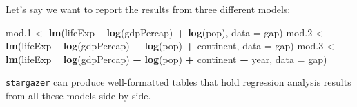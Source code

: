 \documentclass[]{book}
\newenvironment{Shaded}{\begin{snugshade}}{\end{snugshade}}
\newcommand{\DataTypeTok}[1]{\textcolor[rgb]{0.13,0.29,0.53}{#1}}
\newcommand{\FloatTok}[1]{\textcolor[rgb]{0.00,0.00,0.81}{#1}}
\newcommand{\KeywordTok}[1]{\textcolor[rgb]{0.13,0.29,0.53}{\textbf{#1}}}
\newcommand{\NormalTok}[1]{#1}
\newcommand{\OperatorTok}[1]{\textcolor[rgb]{0.81,0.36,0.00}{\textbf{#1}}}
\newcommand{\StringTok}[1]{\textcolor[rgb]{0.31,0.60,0.02}{#1}}
\begin{document}
Let's say we want to report the results from three different models:

\begin{Shaded}
\begin{Highlighting}[]
\NormalTok{mod}\FloatTok{.1}\NormalTok{ <-}\StringTok{ }\KeywordTok{lm}\NormalTok{(lifeExp }\OperatorTok{~}\StringTok{ }\KeywordTok{log}\NormalTok{(gdpPercap) }\OperatorTok{+}\StringTok{ }\KeywordTok{log}\NormalTok{(pop), }\DataTypeTok{data =}\NormalTok{ gap)}
\NormalTok{mod}\FloatTok{.2}\NormalTok{ <-}\StringTok{ }\KeywordTok{lm}\NormalTok{(lifeExp }\OperatorTok{~}\StringTok{ }\KeywordTok{log}\NormalTok{(gdpPercap) }\OperatorTok{+}\StringTok{ }\KeywordTok{log}\NormalTok{(pop) }\OperatorTok{+}\StringTok{ }\NormalTok{continent, }\DataTypeTok{data =}\NormalTok{ gap)}
\NormalTok{mod}\FloatTok{.3}\NormalTok{ <-}\StringTok{ }\KeywordTok{lm}\NormalTok{(lifeExp }\OperatorTok{~}\StringTok{ }\KeywordTok{log}\NormalTok{(gdpPercap) }\OperatorTok{+}\StringTok{ }\KeywordTok{log}\NormalTok{(pop) }\OperatorTok{+}\StringTok{ }\NormalTok{continent }\OperatorTok{+}\StringTok{ }\NormalTok{year, }\DataTypeTok{data =}\NormalTok{ gap)}
\end{Highlighting}
\end{Shaded}

\texttt{stargazer} can produce well-formatted tables that hold regression analysis results from all these models side-by-side.
\end{document}
